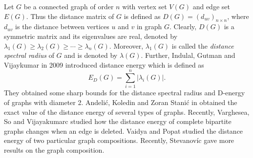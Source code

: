 \documentclass[10pt]{article}
\begin{document}
Let $G$ be a connected graph of order $n$ with vertex set $V(G)$ and edge set $E(G)$. Thus the distance matrix of $G$ is defined as $D(G)=(d_{uv})_{n\times n}$, where $d_{uv}$ is the distance between vertices $u$ and $v$ in graph $G$. Clearly,  $D(G)$ is a symmetric matrix and  its eigenvalues are real, denoted  by $\lambda_1(G)\ge \lambda_2(G)\ge \cdots\ge \lambda_n(G)$. Moreover, $\lambda_1(G)$ is called the {\it distance spectral radius} of $G$ and is denoted by $\lambda(G)$.
   Further, Indulal, Gutman and Vijaykumar \cite{indulal} in 2009 introduced  distance energy which is defined as
$$E_D(G)=\sum_{i=1}^n|\lambda_i(G)|.$$
 They obtained some sharp bounds for the distance spectral radius and D-energy of graphs with diameter 2.
 Andeli\'{c}, Koledin and  Zoran Stani\'{c} in \cite{andelic2017} obtained the exact value of  the distance energy of several types of graphs.
 Recently, Varghesea, So and Vijayakumarc \cite{varghese2018} studied how the distance energy of complete bipartite graphs changes when an edge is deleted.  Vaidya and Popat \cite{vaidya2017}  studied the distance energy  of two particular graph compositions. Recently, Stevanov\'{i}c \cite{stevanovic2018} gave more results on the graph composition.
\end{document}

